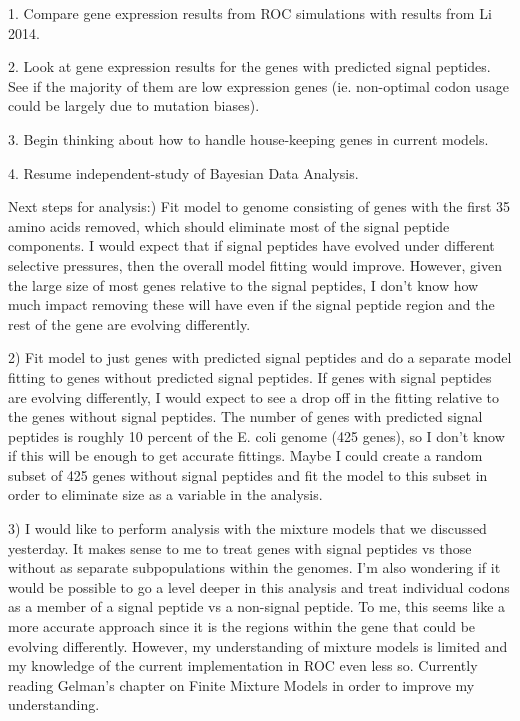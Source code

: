 \documentclass[11pt]{labbook}
\begin{document}
1. Compare gene expression results from ROC simulations with results from Li 2014.

2. Look at gene expression results for the genes with predicted signal peptides. See if the majority of them are low expression genes (ie. non-optimal codon usage could be largely due to mutation biases).

3. Begin thinking about how to handle house-keeping genes in current models.

4. Resume independent-study of Bayesian Data Analysis.


Next steps for analysis:) Fit model to genome consisting of genes with the first 35 amino acids removed, which should eliminate most of the signal peptide components. I would expect that if signal peptides have evolved under different selective pressures, then the overall model fitting would improve. However, given the large size of most genes relative to the signal peptides, I don't know how much impact removing these will have even if the signal peptide region and the rest of the gene are evolving differently. 

2) Fit model to just genes with predicted signal peptides and do a separate model fitting to genes without predicted signal peptides. If genes with signal peptides are evolving differently, I would expect to see a drop off in the fitting relative to the genes without signal peptides. The number of genes with predicted signal peptides is roughly 10 percent of the E. coli genome (425 genes), so I don't know if this will be enough to get accurate fittings. Maybe I could create a random subset of 425 genes without signal peptides and fit the model to this subset in order to eliminate size as a variable in the analysis.

3) I would like to perform analysis with the mixture models that we discussed yesterday. It makes sense to me to treat genes with signal peptides vs those without as separate subpopulations within the genomes. I'm also wondering if it would be possible to go a level deeper in this analysis and treat individual codons as a member of a signal peptide vs a non-signal peptide. To me, this seems like a more accurate approach since it is the regions within the gene that could be evolving differently. However, my understanding of mixture models is limited and my knowledge of the current implementation in ROC even less so. Currently reading Gelman's chapter on Finite Mixture Models in order to improve my understanding. 
\end{document}
